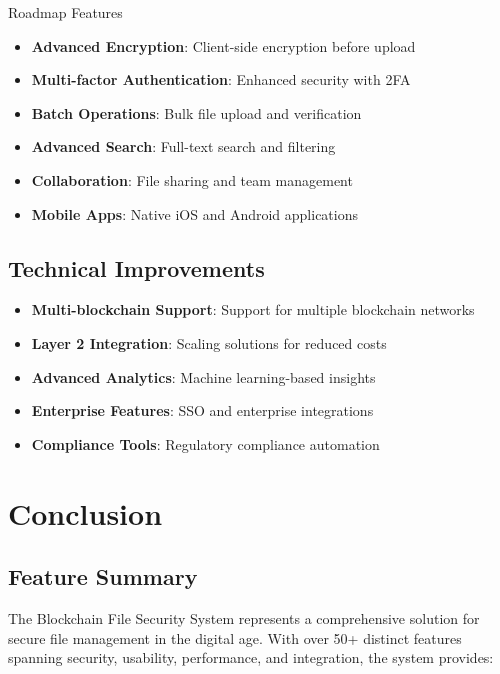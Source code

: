 \documentclass[11pt,a4paper]{article}
\begin{document}
\begin{featurebox}{\faRoad\space Roadmap Features}
\begin{itemize}
    \item \textbf{Advanced Encryption}: Client-side encryption before upload
    \item \textbf{Multi-factor Authentication}: Enhanced security with 2FA
    \item \textbf{Batch Operations}: Bulk file upload and verification
    \item \textbf{Advanced Search}: Full-text search and filtering
    \item \textbf{Collaboration}: File sharing and team management
    \item \textbf{Mobile Apps}: Native iOS and Android applications
\end{itemize}
\end{featurebox}

\subsection{Technical Improvements}

\begin{itemize}
    \item \textbf{Multi-blockchain Support}: Support for multiple blockchain networks
    \item \textbf{Layer 2 Integration}: Scaling solutions for reduced costs
    \item \textbf{Advanced Analytics}: Machine learning-based insights
    \item \textbf{Enterprise Features}: SSO and enterprise integrations
    \item \textbf{Compliance Tools}: Regulatory compliance automation
\end{itemize}

\section{Conclusion}

\subsection{Feature Summary}

The Blockchain File Security System represents a comprehensive solution for secure file management in the digital age. With over 50+ distinct features spanning security, usability, performance, and integration, the system provides:
\end{document}
